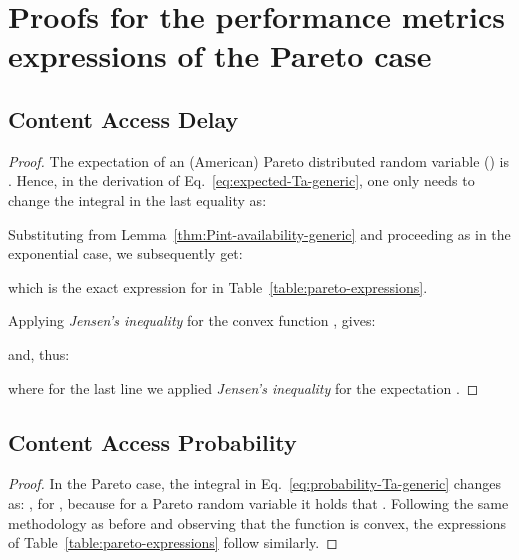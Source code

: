 \documentclass[journal]{IEEEtran}
\newcommand{\eq}[1]{Eq.~\eqref{#1}}
\begin{document}
\section{Proofs for the performance metrics expressions of the Pareto case}\label{appendix:pareto-expressions-proofs}
\subsection{Content Access Delay}
\begin{proof}
The expectation of an (American) Pareto distributed random variable () is . Hence, in the derivation of \eq{eq:expected-Ta-generic}, one only needs to change the integral in the last equality as:

Substituting  from Lemma~\ref{thm:Pint-availability-generic} and proceeding as in the exponential case, we subsequently get:

which is the exact expression for  in Table~\ref{table:pareto-expressions}.

Applying \textit{Jensen's inequality} for the convex function , gives:

and, thus:

where for the last line we applied \textit{Jensen's inequality} for the expectation .
\end{proof}

\subsection{Content Access Probability}
\begin{proof}
In the Pareto case, the integral in \eq{eq:probability-Ta-generic} changes as: , for , because for a Pareto random variable  it holds that . Following the same methodology as before and observing that the function  is convex, the expressions of Table~\ref{table:pareto-expressions} follow similarly.
\end{proof}
\end{document}

